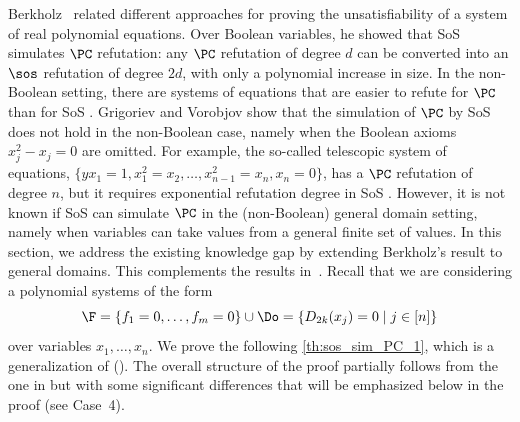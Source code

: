 \documentclass[11pt]{article}
\newtheorem{theorem}{Theorem}[section]
\begin{document}
Berkholz~\cite{berkholz18} related different approaches for proving the unsatisfiability of a system of real polynomial equations. Over Boolean variables, he showed that SoS simulates $\PC$ refutation: any \(\PC\) refutation of degree \(d\) can be converted into an \(\sos\) refutation of degree \(2d\), with only a polynomial increase in size.
%
In the non-Boolean setting, there are systems of equations that are easier to refute for $\PC$ than for SoS \cite{GrigorievV01}. Grigoriev and Vorobjov \cite{GrigorievV01} show that the simulation of $\PC$ by SoS does not hold in the non-Boolean case, namely when the Boolean axioms $x_j^2-x_j=0$ are omitted. For example, the so-called telescopic system of equations, $\{ yx_1=1, x_1^2=x_2, \ldots, x_{n-1}^2=x_n, x_n=0\}$, has a $\PC$ refutation of degree $n$, but it requires exponential refutation degree in SoS \cite{GrigorievV01}.
However, it is not known if SoS can simulate $\PC$ in the (non-Boolean) general domain setting, namely when variables can take values from a general finite set of values. 
In this section, we address the existing knowledge gap by extending Berkholz's result to general domains. This complements the results in~\cite{GrigorievV01,berkholz18}.
%
%
Recall that we are considering a polynomial systems of the form 
%
\begin{equation}
    \F=\{f_1=0,\ldots,f_m=0\} \cup \Do=\{D_{2k}(x_j)=0\mid j\in[n]\}
\end{equation}
%
over variables $x_1,\ldots,x_n$. We prove the following \cref{th:sos_sim_PC_1}, which is a generalization of (\cite[Lemma 1]{berkholz18}). The overall structure of the proof partially follows from the one in \cite{berkholz18} but with some significant differences that will be emphasized below in the proof (see Case~4).
\end{document}
